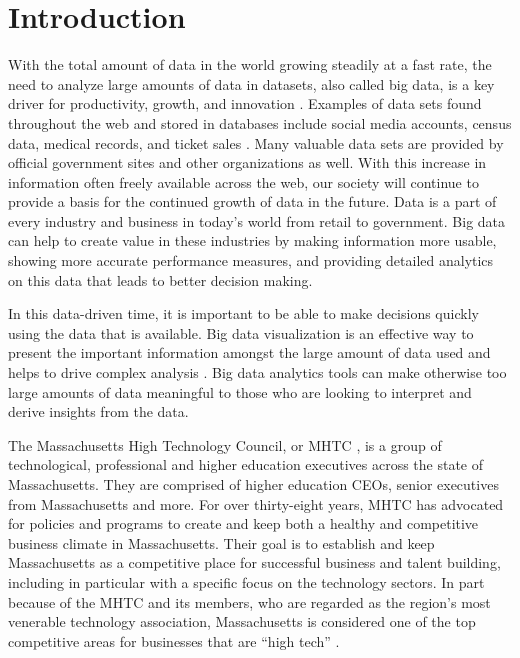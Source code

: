 \chapter{Introduction}

	With the total amount of data in the world growing steadily at a fast rate, 
	the need to analyze large amounts of data in datasets, also called big data, is a 
	key driver for productivity, growth, and innovation \cite{bigdata}. Examples of data sets found throughout the web and stored in databases 
	include social media accounts, census data, medical records, and ticket sales \cite{bdex}. Many valuable data sets are provided by official government sites and other organizations as well. 
	With this increase in information often freely available across the web, 
	our society will continue to provide a basis for the continued growth of 
	data in the future. Data is a part of every industry and business in today's 
	world from retail to government. Big data can help to create
	 value in these industries by making information more usable, showing more 
	 accurate performance measures, and providing detailed analytics on this data that 
	 leads to better decision making.

	In this data-driven time, it is important to be able to make decisions 
	quickly using the data that is available. Big data visualization is an 
	effective way to present the important information amongst the large amount 
	of data used and helps to drive complex analysis \cite{bigdata}. Big 
	data analytics tools can make otherwise too large amounts of data meaningful 
	to those who are looking to interpret and derive insights from the data.

	The Massachusetts High Technology Council, or MHTC \cite{mhtc}, is a group of technological, 
	professional and higher education executives across the state of Massachusetts. 
	They are comprised of higher education CEOs, senior executives from Massachusetts 
	and more. For over thirty-eight years, MHTC has advocated for policies 
	and programs to create and keep both a healthy and competitive business climate in Massachusetts. 
	Their goal is to establish and keep Massachusetts as a competitive place for 
	successful business and talent building, including in particular with a specific focus on the 
	technology sectors. In part because of the MHTC and its members, who are 
	regarded as the region's most venerable technology association, Massachusetts 
	is considered one of the top competitive areas for businesses that are “high tech” \cite{mhtc}.

